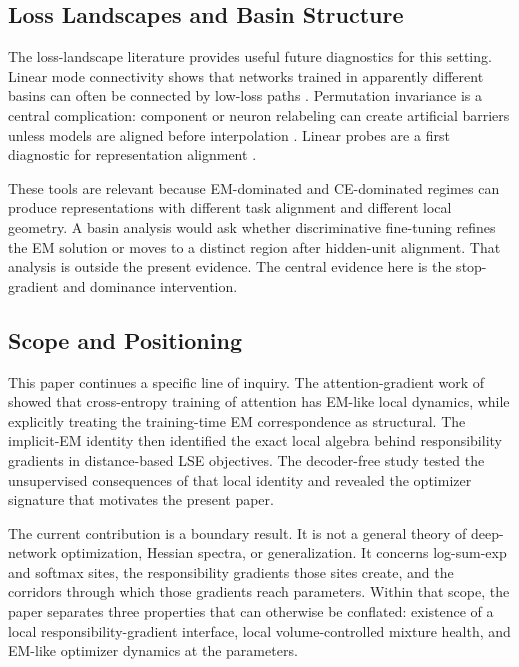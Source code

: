 \subsection{Loss Landscapes and Basin Structure}
The loss-landscape literature provides useful future diagnostics for this
setting. Linear mode connectivity shows that networks trained in apparently
different basins can often be connected by low-loss paths
\citep{frankle2020linear}. Permutation invariance is a central complication:
component or neuron relabeling can create artificial barriers unless models
are aligned before interpolation \citep{entezari2022role,ainsworth2023git}.
Linear probes are a first diagnostic for representation alignment
\citep{alain2016understanding}.

These tools are relevant because EM-dominated and CE-dominated regimes can
produce representations with different task alignment and different local
geometry. A basin analysis would ask whether discriminative fine-tuning
refines the EM solution or moves to a distinct region after hidden-unit
alignment. That analysis is outside the present evidence. The central
evidence here is the stop-gradient and dominance intervention.

\subsection{Scope and Positioning}
This paper continues a specific line of inquiry. The attention-gradient work
of \citet{agarwal2025gradient} showed that cross-entropy training of
attention has EM-like local dynamics, while explicitly treating the
training-time EM correspondence as structural. The implicit-EM identity then
identified the exact local algebra behind responsibility gradients in
distance-based LSE objectives. The decoder-free study
\citep{oursland2026decoderfree} tested the unsupervised consequences of that
local identity and revealed the optimizer signature that motivates the present
paper.

The current contribution is a boundary result. It is not a general theory of
deep-network optimization, Hessian spectra, or generalization. It concerns
log-sum-exp and softmax sites, the responsibility gradients those sites
create, and the corridors through which those gradients reach parameters.
Within that scope, the paper separates three properties that can otherwise be
conflated: existence of a local responsibility-gradient interface, local
volume-controlled mixture health, and EM-like optimizer dynamics at the
parameters.
